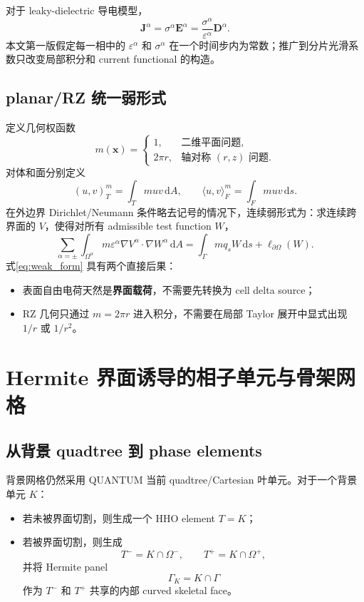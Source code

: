 \documentclass[UTF8,a4paper,11pt]{ctexart}
\newcommand{\dd}{\mathrm{d}}
\newcommand{\eps}{\varepsilon}
\newcommand{\vct}[1]{\bm{#1}}
\begin{document}
对于 leaky-dielectric 导电模型，
\begin{equation}
\vct J^\alpha=\sigma^\alpha\vct E^\alpha
=\frac{\sigma^\alpha}{\eps^\alpha}\vct D^\alpha.
\label{eq:ohmic_current}
\end{equation}
本文第一版假定每一相中的 \(\eps^\alpha\) 和 \(\sigma^\alpha\) 在一个时间步内为常数；推广到分片光滑系数只改变局部积分和 current functional 的构造。

\subsection{planar/RZ 统一弱形式}

定义几何权函数
\begin{equation}
m(\vct x)=
\begin{cases}
1, & \text{二维平面问题},\\
2\pi r, & \text{轴对称 }(r,z)\text{ 问题}.
\end{cases}
\label{eq:measure_weight}
\end{equation}
对体和面分别定义
\[
(u,v)_T^m=\int_Tmuv\,\dd A,
\qquad
\langle u,v\rangle_F^m=\int_Fmuv\,\dd s.
\]
在外边界 Dirichlet/Neumann 条件略去记号的情况下，连续弱形式为：求连续跨界面的 \(V\)，使得对所有 admissible test function \(W\)，
\begin{equation}
\boxed{
\sum_{\alpha=\pm}
\int_{\Omega^\alpha}
m\eps^\alpha\nabla V^\alpha\cdot\nabla W^\alpha\,\dd A
=
\int_\Gamma mq_sW\,\dd s
+\ell_{\partial\Omega}(W).
}
\label{eq:weak_form}
\end{equation}
式\eqref{eq:weak_form} 具有两个直接后果：
\begin{itemize}
  \item 表面自由电荷天然是\textbf{界面载荷}，不需要先转换为 cell delta source；
  \item RZ 几何只通过 \(m=2\pi r\) 进入积分，不需要在局部 Taylor 展开中显式出现 \(1/r\) 或 \(1/r^2\)。
\end{itemize}

\section{Hermite 界面诱导的相子单元与骨架网格}

\subsection{从背景 quadtree 到 phase elements}

背景网格仍然采用 QUANTUM 当前 quadtree/Cartesian 叶单元。对于一个背景单元 \(K\)：
\begin{itemize}
  \item 若未被界面切割，则生成一个 HHO element \(T=K\)；
  \item 若被界面切割，则生成
  \[
  T^-=K\cap\Omega^- ,\qquad T^+=K\cap\Omega^+,
  \]
  并将 Hermite panel
  \[
  \Gamma_K=K\cap\Gamma
  \]
  作为 \(T^-\) 和 \(T^+\) 共享的内部 curved skeletal face。
\end{itemize}
\end{document}
